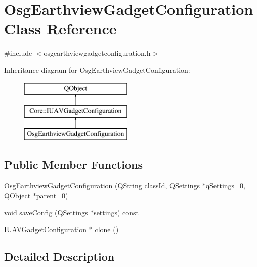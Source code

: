 \hypertarget{class_osg_earthview_gadget_configuration}{\section{Osg\-Earthview\-Gadget\-Configuration Class Reference}
\label{class_osg_earthview_gadget_configuration}
}


{\ttfamily \#include $<$osgearthviewgadgetconfiguration.\-h$>$}

Inheritance diagram for Osg\-Earthview\-Gadget\-Configuration\-:\begin{figure}[H]
\begin{center}
\leavevmode
\includegraphics[height=3.000000cm]{class_osg_earthview_gadget_configuration}
\end{center}
\end{figure}
\subsection*{Public Member Functions}
\begin{DoxyCompactItemize}
\item 
\hyperlink{class_osg_earthview_gadget_configuration_a3f1d9877b4ce0bbda5ac9628c39ebe63}{Osg\-Earthview\-Gadget\-Configuration} (\hyperlink{group___u_a_v_objects_plugin_gab9d252f49c333c94a72f97ce3105a32d}{Q\-String} \hyperlink{group___core_plugin_gac953657221ba7fda967ada0408332641}{class\-Id}, Q\-Settings $\ast$q\-Settings=0, Q\-Object $\ast$parent=0)
\item 
\hyperlink{group___u_a_v_objects_plugin_ga444cf2ff3f0ecbe028adce838d373f5c}{void} \hyperlink{class_osg_earthview_gadget_configuration_a2b06ccd271866ae4acfa83524bbabd1b}{save\-Config} (Q\-Settings $\ast$settings) const 
\item 
\hyperlink{group___core_plugin_gacdfdf0b1e39b5002472b76b6564ce51f}{I\-U\-A\-V\-Gadget\-Configuration} $\ast$ \hyperlink{class_osg_earthview_gadget_configuration_a5b99c466e1f2790b5faf0f26bb1a4bce}{clone} ()
\end{DoxyCompactItemize}


\subsection{Detailed Description}


